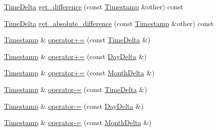 \begin{DoxyCompactItemize}
\item 
\hyperlink{structTimeDelta}{\-Time\-Delta} \hyperlink{structTimestamp_a7d78f2151082c1c080364e2676b88d35}{get\-\_\-difference} (const \hyperlink{structTimestamp}{\-Timestamp} \&other) const 
\item 
\hyperlink{structTimeDelta}{\-Time\-Delta} \hyperlink{structTimestamp_abfe068b22473f173011e7907a0fd8a9c}{get\-\_\-absolute\-\_\-difference} (const \hyperlink{structTimestamp}{\-Timestamp} \&other) const 
\item 
\hyperlink{structTimestamp}{\-Timestamp} \& \hyperlink{structTimestamp_ac2348d7a44a83019af671af64bce3251}{operator+=} (const \hyperlink{structTimeDelta}{\-Time\-Delta} \&)
\item 
\hyperlink{structTimestamp}{\-Timestamp} \& \hyperlink{structTimestamp_abfa4b1739e1ac43a76993ca40a937a1f}{operator+=} (const \hyperlink{structDayDelta}{\-Day\-Delta} \&)
\item 
\hyperlink{structTimestamp}{\-Timestamp} \& \hyperlink{structTimestamp_ad8c5dbb58c51005157c1ca2ef9a16f3d}{operator+=} (const \hyperlink{structMonthDelta}{\-Month\-Delta} \&)
\item 
\hyperlink{structTimestamp}{\-Timestamp} \& \hyperlink{structTimestamp_a61f52e1ead63b1a3d1752de6107dde2c}{operator-\/=} (const \hyperlink{structTimeDelta}{\-Time\-Delta} \&)
\item 
\hyperlink{structTimestamp}{\-Timestamp} \& \hyperlink{structTimestamp_aaa8407a2a8742f77ae3d41ae98a369fa}{operator-\/=} (const \hyperlink{structDayDelta}{\-Day\-Delta} \&)
\item 
\hyperlink{structTimestamp}{\-Timestamp} \& \hyperlink{structTimestamp_a1afa88ddd92792bcdbaccf2761ea1988}{operator-\/=} (const \hyperlink{structMonthDelta}{\-Month\-Delta} \&)
\end{DoxyCompactItemize}
